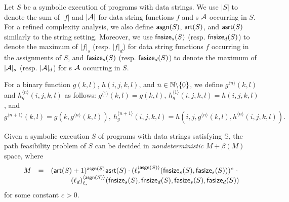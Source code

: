 Let $S$ be a symbolic execution of programs with data strings.  We use $|S|$ to denote the sum of $|f|$ and $|\mathcal{A}|$ for data string functions $f$ and \SA{}s $\mathcal{A}$ occurring in $S$.  
For a refined complexity analysis, we also define $\mathsf{asgn}(S)$, $\mathsf{art}(S)$, and $\mathsf{asrt}(S)$ similarly to the string setting. Moreover, we use $\mathsf{fnsize}_s(S)$ (resp. $\mathsf{fnsize}_d(S)$) to denote the maximum of $|f|_s$ (resp. $|f|_d$) for data string functions $f$ occurring in the assignments of $S$, and $\mathsf{fasize}_s(S)$ (resp. $\mathsf{fasize}_d(S)$) to denote the maximum of $|\mathcal{A}|_s$ (resp. $|\mathcal{A}|_d$) for \SA{}s $\mathcal{A}$ occurring in $S$.





For a binary function $g(k, l)$, $h(i, j, k, l)$, and $n \in \mathbb{N} \backslash \{0\}$, we define $g^{\langle n \rangle}(k, l)$ and $h^{\langle n \rangle}_g(i, j, k, l)$ as follows: $g^{\langle 1 \rangle}( k, l) = g(k, l)$, $h^{\langle 1 \rangle}_g(i, j, k, l) = h(i, j, k, l)$, and 
$$g^{\langle n+1 \rangle}( k, l) = g(k, g^{\langle n \rangle}( k, l)), \ h^{\langle n+1 \rangle}_g (i, j, k, l) = h(i, j, g^{\langle n \rangle}(k, l), h^{\langle n \rangle}(i, j, k, l)).$$


\begin{theorem}\label{thm-generic-dec-symbolic}
	Given a symbolic execution  $S$ of programs with data strings satisfying $\mathbb{S}$\prerec{}, the path feasibility problem of $S$ can be decided in \emph{nondeterministic} $M+ \beta(M)$ space, where  
	\[
	\begin{array}{l c l}
		M & = & (\mathsf{art}(S)+1)^{\mathsf{asgn}(S)}  \mathsf{asrt}(S) \cdot  (\ell_s^{\langle \mathsf{asgn}(S) \rangle}(\mathsf{fnsize}_s(S), \mathsf{fasize}_s(S)))^{c}\ \cdot \\
		& &  \hspace{1cm} (\ell_d)^{\langle  \mathsf{asgn}(S) \rangle}_{\ell_s}(\mathsf{fnsize}_s(S),\mathsf{fnsize}_d(S),  \mathsf{fasize}_s(S), \mathsf{fasize}_d(S))
\end{array}
	\]
for some constant $c > 0$. 
\end{theorem}



